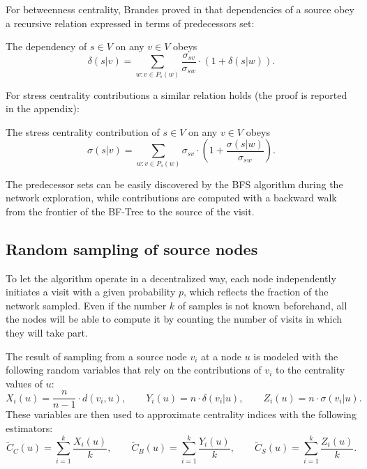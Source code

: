 For betweenness centrality, Brandes proved in \cite{brandes2001} that dependencies of a source obey a recursive relation expressed in terms of predecessors set:
\begin{theorem}[Brandes, 2001]
\label{th:contrib:bc}
The dependency of $s \in V$ on any $v \in V$ obeys
\begin{equation} \label{eq:th:contrib:bc}
\delta(s|v) = \sum_{w : v \in P_s(w)} \frac{\sigma_{sv}}{\sigma_{sw}} \cdot (1 + \delta(s|w)) .
\end{equation}
\end{theorem}
For stress centrality contributions a similar relation holds (the proof is reported in the appendix):
\begin{theorem}
\label{th:contrib:sc}
The stress centrality contribution of $s \in V$ on any $v \in V$ obeys
\begin{equation} \label{eq:th:contrib:sc}
\sigma(s|v) = \sum_{w : v \in P_s(w)} \sigma_{sv} \cdot \left( 1 + \frac{\sigma(s|w)}{\sigma_{sw}} \right) .
\end{equation}
\end{theorem}

The predecessor sets can be easily discovered by the BFS algorithm during the network exploration, while contributions are computed with a backward walk from the frontier of the BF-Tree to the source of the visit.

\subsection{Random sampling of source nodes}

To let the algorithm operate in a decentralized way, each node independently initiates a visit with a given probability $p$, which reflects the fraction of the network sampled. Even if the number $k$ of samples is not known beforehand, all the nodes will be able to compute it by counting the number of visits in which they will take part.

The result of sampling from a source node $v_i$ at a node $u$ is modeled with the following random variables that rely on the contributions of $v_i$ to the centrality values of $u$:
\begin{equation*}
X_i(u) = \frac{n}{n-1} \cdot d(v_i,u) , \qquad
Y_i(u) = n \cdot \delta(v_i|u) , \qquad
Z_i(u) = n \cdot \sigma(v_i|u) .
\end{equation*}
These variables are then used to approximate centrality indices with the following estimators:
\begin{equation*}
\widetilde{C}_C(u) = \sum_{i=1}^k \frac{X_i(u)}{k}, \qquad
\widetilde{C}_B(u) = \sum_{i=1}^k \frac{Y_i(u)}{k}, \qquad
\widetilde{C}_S(u) = \sum_{i=1}^k \frac{Z_i(u)}{k} .
\end{equation*}

